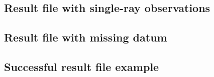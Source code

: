 \documentclass{article}
\begin{document}
\scriptsize



\subsection{Result file with single-ray observations}
\label{sec:singleRayResultFile}

\scriptsize



\subsection{Result file with missing datum}
\label{sec:missingDatumResultFile}

\scriptsize



\subsection{Successful result file example}
\label{sec:resultFile}

\scriptsize

\end{document}
